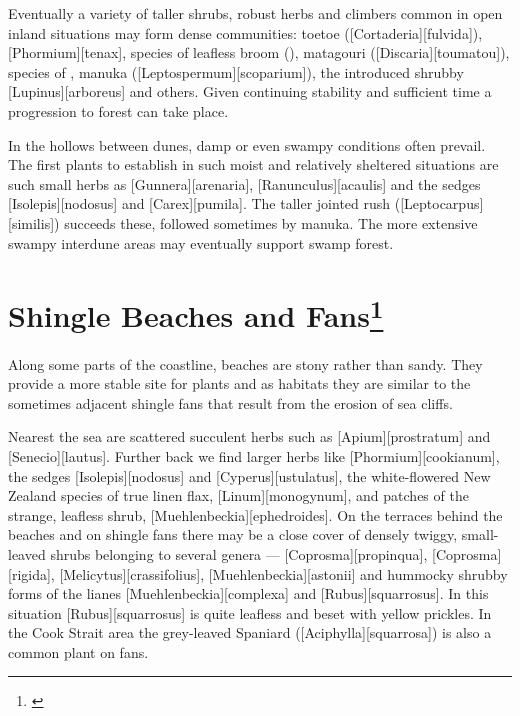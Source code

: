 Eventually a variety of taller shrubs, robust herbs and climbers common in open inland situations may form dense communities: toetoe ([Cortaderia][fulvida]),  [Phormium][tenax], species of leafless broom (), matagouri ([Discaria][toumatou]), species of , manuka ([Leptospermum][scoparium]), the introduced shrubby [Lupinus][arboreus] and others.
Given continuing stability and sufficient time a progression to forest can take place.

In the hollows between dunes, damp or even swampy conditions often prevail.
The first plants to establish in such moist and relatively sheltered situations are such small herbs as [Gunnera][arenaria], [Ranunculus][acaulis] and the sedges [Isolepis][nodosus] and [Carex][pumila].
The taller jointed rush ([Leptocarpus][similis]) succeeds these, followed sometimes by manuka.
The more extensive swampy interdune areas may eventually support swamp forest.

\section[Shingle Beaches and Fans]{Shingle Beaches and Fans\thinspace\footnote{\cite{moore1963plants}}}

Along some parts of the coastline, beaches are stony rather than sandy.
They provide a more stable site for plants and as habitats they are similar to the sometimes adjacent shingle fans that result from the erosion of sea cliffs.

Nearest the sea are scattered succulent herbs such as [Apium][prostratum] and [Senecio][lautus].
Further back we find larger herbs like [Phormium][cookianum], the sedges [Isolepis][nodosus] and [Cyperus][ustulatus], the white-flowered New Zealand species of true linen flax, [Linum][monogynum], and patches of the strange, leafless shrub, [Muehlenbeckia][ephedroides].
On the terraces behind the beaches and on shingle fans there may be a close cover of densely twiggy, small-leaved shrubs belonging to several genera --- [Coprosma][propinqua], [Coprosma][rigida],  [Melicytus][crassifolius],  [Muehlenbeckia][astonii] and hummocky shrubby forms of the lianes [Muehlenbeckia][complexa] and [Rubus][squarrosus].
In this situation [Rubus][squarrosus] is quite leafless and beset with yellow prickles.
In the Cook Strait area the grey-leaved Spaniard ([Aciphylla][squarrosa]) is also a common plant on fans.

